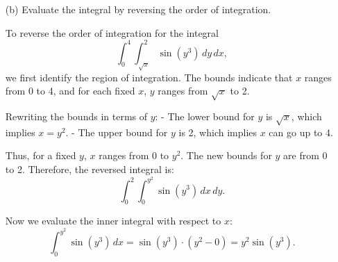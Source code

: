 \documentclass[reqno, 12pt]{amsart}
\begin{document}
\begin{itemize}
\begin{itemize}
\begin{answerbox}
\begin{center}
          \end{center}
        \end{answerbox}
        \vspace{0.5 in}
        \newpage
      \item[(b)] Evaluate the integral by reversing the order of integration.
        \newline

        \begin{answerbox}
          To reverse the order of integration for the integral
          \[
            \int_0^4 \int_{\sqrt{x}}^2 \sin(y^3) \, dy \, dx,
          \]
          we first identify the region of integration. The bounds indicate that \(x\) ranges from 0 to 4, and for each fixed \(x\), \(y\) ranges from \(\sqrt{x}\) to 2.

          Rewriting the bounds in terms of \(y\):
          - The lower bound for \(y\) is \(\sqrt{x}\), which implies \(x = y^2\).
          - The upper bound for \(y\) is 2, which implies \(x\) can go up to 4.

          Thus, for a fixed \(y\), \(x\) ranges from 0 to \(y^2\). The new bounds for \(y\) are from 0 to 2. Therefore, the reversed integral is:
          \[
            \int_0^2 \int_0^{y^2} \sin(y^3) \, dx \, dy.
          \]

          Now we evaluate the inner integral with respect to \(x\):
          \[
            \int_0^{y^2} \sin(y^3) \, dx = \sin(y^3) \cdot (y^2 - 0) = y^2 \sin(y^3).
          \]


\end{answerbox}
\end{itemize}
\end{itemize}
\end{document}
